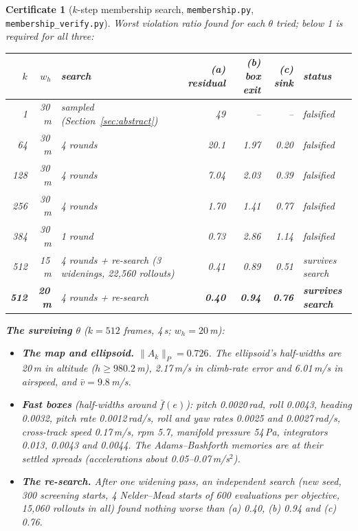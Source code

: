 \documentclass[11pt]{article}
\newtheorem{cert}{Certificate}
\begin{document}
\begin{cert}[$k$-step membership search, \texttt{membership.py}, \texttt{membership\_verify.py}]\label{cert:member}
Worst violation ratio found for each $\theta$ tried; below 1 is required for all three:

\begin{center}
\begin{tabular}{rrlrrrl}
\toprule
$k$ & $w_h$ & search & (a) residual & (b) box exit & (c) sink & status\\
\midrule
1 & 30\,m & sampled (Section~\ref{sec:abstract}) & 49 & -- & -- & falsified\\
64 & 30\,m & 4 rounds & 20.1 & 1.97 & 0.20 & falsified\\
128 & 30\,m & 4 rounds & 7.04 & 2.03 & 0.39 & falsified\\
256 & 30\,m & 4 rounds & 1.70 & 1.41 & 0.77 & falsified\\
384 & 30\,m & 1 round & 0.73 & 2.86 & 1.14 & falsified\\
512 & 15\,m & 4 rounds + re-search (3 widenings, 22{,}560 rollouts) & 0.41 & 0.89 & 0.51 & survives search\\
\textbf{512} & \textbf{20\,m} & 4 rounds + re-search & \textbf{0.40} & \textbf{0.94} & \textbf{0.76} & \textbf{survives search}\\
\bottomrule
\end{tabular}
\end{center}

\textbf{The surviving $\theta$} ($k = 512$ frames, 4\,s; $w_h = 20$\,m):
\begin{itemize}
\item \textbf{The map and ellipsoid.} $\|A_k\|_P = 0.726$. The ellipsoid's half-widths are 20\,m in altitude ($h \ge 980.2$\,m), 2.17\,m/s in climb-rate error and 6.01\,m/s in airspeed, and $\bar v = 9.8$\,m/s.
\item \textbf{Fast boxes} (half-widths around $\bar f(e)$): pitch 0.0020\,rad, roll 0.0043, heading 0.0032, pitch rate 0.0012\,rad/s, roll and yaw rates 0.0025 and 0.0027\,rad/s, cross-track speed 0.17\,m/s, rpm 5.7, manifold pressure 54\,Pa, integrators 0.013, 0.0043 and 0.0044. The Adams--Bashforth memories are at their settled spreads (accelerations about 0.05--0.07\,m/s$^2$).
\item \textbf{The re-search.} After one widening pass, an independent search (new seed, 300 screening starts, 4 Nelder--Mead starts of 600 evaluations per objective, 15{,}060 rollouts in all) found nothing worse than (a) 0.40, (b) 0.94 and (c) 0.76.
\end{itemize}
\end{cert}
\end{document}

